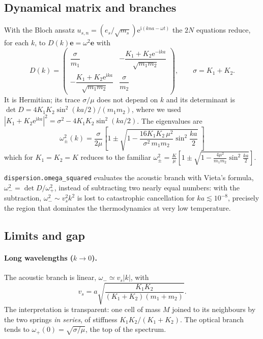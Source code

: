 \documentclass[11pt,a4paper]{article}
\newcommand{\ii}{\mathrm{i}}
\newcommand{\ee}{\mathrm{e}}
\newcommand{\vs}{v_{s}}
\newcommand{\code}[1]{\texttt{#1}}
\begin{document}
\subsection{Dynamical matrix and branches}

With the Bloch ansatz $u_{s,n}=(e_s/\sqrt{m_s})\ee^{\ii(kna-\omega t)}$ the
$2N$ equations reduce, for each $k$, to $D(k)\bm e=\omega^2\bm e$ with
\begin{equation}
D(k)=\begin{pmatrix}
\dfrac{\sigma}{m_1} & -\dfrac{K_1+K_2\ee^{-\ii ka}}{\sqrt{m_1m_2}}\\[10pt]
-\dfrac{K_1+K_2\ee^{\ii ka}}{\sqrt{m_1m_2}} & \dfrac{\sigma}{m_2}
\end{pmatrix},\qquad \sigma=K_1+K_2 .
\end{equation}
It is Hermitian; its trace $\sigma/\mu$ does not depend on $k$ and its
determinant is $\det D=4K_1K_2\sin^2(ka/2)/(m_1m_2)$, where we used
$|K_1+K_2\ee^{\ii ka}|^2=\sigma^2-4K_1K_2\sin^2(ka/2)$. The eigenvalues are
\begin{equation}
\boxed{\;\omega_\pm^2(k)=\frac{\sigma}{2\mu}\left[1\pm\sqrt{1-\frac{16K_1K_2\,\mu^2}{\sigma^2\,m_1m_2}\sin^2\frac{ka}{2}}\;\right]\;}
\end{equation}
which for $K_1=K_2=K$ reduces to the familiar
$\omega_\pm^2=\frac{K}{\mu}\left[1\pm\sqrt{1-\frac{4\mu^2}{m_1m_2}\sin^2\frac{ka}{2}}\right]$.

\begin{codigo}
\code{dispersion.omega\_squared} evaluates the acoustic branch with Vieta's
formula, $\omega_-^2=\det D/\omega_+^2$, instead of subtracting two nearly
equal numbers: with the subtraction, $\omega_-^2\sim\vs^2k^2$ is lost to
catastrophic cancellation for $ka\lesssim10^{-8}$, precisely the region that
dominates the thermodynamics at very low temperature.
\end{codigo}

\subsection{Limits and gap}

\paragraph{Long wavelengths ($k\to0$).} The acoustic branch is linear,
$\omega_-\simeq\vs|k|$, with
\begin{equation}
\vs=a\sqrt{\frac{K_1K_2}{(K_1+K_2)(m_1+m_2)}} .
\end{equation}
The interpretation is transparent: one cell of mass $M$ joined to its
neighbours by the two springs \emph{in series}, of stiffness
$K_1K_2/(K_1+K_2)$. The optical branch tends to $\omega_+(0)=\sqrt{\sigma/\mu}$,
the top of the spectrum.
\end{document}
